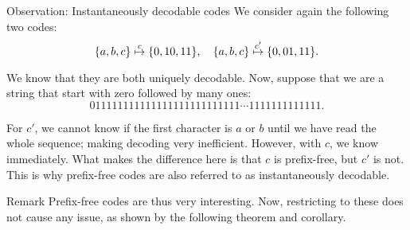 \documentclass[a4paper]{article}
\begin{document}
\begin{parag}{Observation: Instantaneously decodable codes}
    We consider again the following two codes: 
    \[\left\{a, b, c\right\} \over{\mapsto}{$c$}  \left\{0, 10, 11\right\}, \mathspace \left\{a, b, c\right\} \over{\mapsto}{$c'$}  \left\{0, 01, 11\right\}.\]
     
    We know that they are both uniquely decodable. Now, suppose that we are a string that start with zero followed by many ones: 
    \[011111111111111111111111111 \cdots 1111111111111.\]
    
    For $c'$, we cannot know if the first character is $a$ or $b$ until we have read the whole sequence; making decoding very inefficient. However, with $c$, we know immediately. What makes the difference here is that $c$ is prefix-free, but $c'$ is not. This is why prefix-free codes are also referred to as instantaneously decodable. 

    \begin{subparag}{Remark}
        Prefix-free codes are thus very interesting. Now, restricting to these does not cause any issue, as shown by the following theorem and corollary.
    \end{subparag}
\end{parag}
\end{document}
